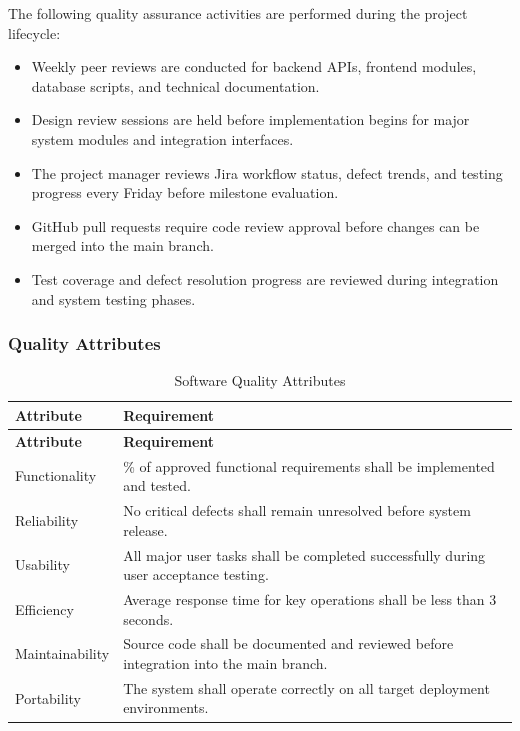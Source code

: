 \documentclass[12pt,a4paper]{article}
\begin{document}
The following quality assurance activities are performed during the project lifecycle:

\begin{itemize}[leftmargin=*]
    \item Weekly peer reviews are conducted for backend APIs, frontend modules, database scripts, and technical documentation.
    \item Design review sessions are held before implementation begins for major system modules and integration interfaces.
    \item The project manager reviews Jira workflow status, defect trends, and testing progress every Friday before milestone evaluation.
    \item GitHub pull requests require code review approval before changes can be merged into the main branch.
    \item Test coverage and defect resolution progress are reviewed during integration and system testing phases.
\end{itemize}

\subsubsection{Quality Attributes}
{\footnotesize
\begin{longtable}{@{}l >{\raggedright\arraybackslash}p{11cm}@{}}
\caption{Software Quality Attributes}\label{tab:quality_attributes}\\
\toprule
\textbf{Attribute} & \textbf{Requirement} \\
\midrule
\endfirsthead
\toprule
\textbf{Attribute} & \textbf{Requirement} \\
\midrule
\endhead
Functionality & 100\% of approved functional requirements shall be implemented and tested. \\
Reliability & No critical defects shall remain unresolved before system release. \\
Usability & All major user tasks shall be completed successfully during user acceptance testing. \\
Efficiency & Average response time for key operations shall be less than 3 seconds. \\
Maintainability & Source code shall be documented and reviewed before integration into the main branch. \\
Portability & The system shall operate correctly on all target deployment environments. \\
\bottomrule
\end{longtable}
}
\end{document}
